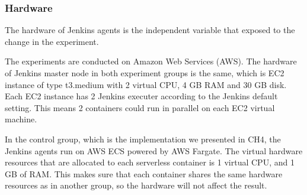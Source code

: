 \subsubsection{Hardware}
The hardware of Jenkins agents is the independent variable that exposed to the change in the experiment.
\par
The experiments are conducted on Amazon Web Services (AWS). The hardware of Jenkins master node in both experiment groups is the same, which is EC2 instance of type t3.medium with 2 virtual CPU, 4 GB RAM and 30 GB disk. Each EC2 instance has 2 Jenkins executer according to the Jenkins default setting. This means 2 containers could run in parallel on each EC2 virtual machine.
\par
In the control group, which is the implementation we presented in CH4, the Jenkins agents run on AWS ECS powered by AWS Fargate. The virtual hardware resources that are allocated to each serverless container is 1 virtual CPU, and 1 GB of RAM. This makes sure that each container shares the same hardware resources as in another group, so the hardware will not affect the result.
